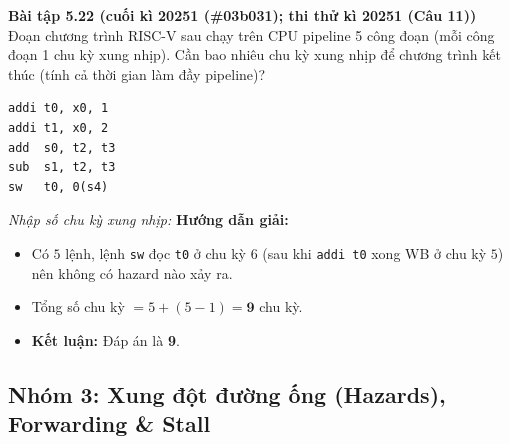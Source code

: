 \textbf{Bài tập 5.22 (cuối kì 20251 (\#03b031); thi thử kì 20251 (Câu 11))}\\
Đoạn chương trình RISC-V sau chạy trên CPU pipeline 5 công đoạn (mỗi công đoạn 1 chu kỳ xung nhịp). Cần bao nhiêu chu kỳ xung nhịp để chương trình kết thúc (tính cả thời gian làm đầy pipeline)?
\begin{lstlisting}
addi t0, x0, 1
addi t1, x0, 2
add  s0, t2, t3
sub  s1, t2, t3
sw   t0, 0(s4)
\end{lstlisting}
\textit{Nhập số chu kỳ xung nhịp:}
\textbf{Hướng dẫn giải:}
\begin{itemize}
    \item Có $5$ lệnh, lệnh \texttt{sw} đọc \texttt{t0} ở chu kỳ $6$ (sau khi \texttt{addi t0} xong WB ở chu kỳ $5$) nên không có hazard nào xảy ra.
    \item Tổng số chu kỳ $= 5 + (5 - 1) = \mathbf{9}$ chu kỳ.
    \item \textbf{Kết luận:} Đáp án là \textbf{9}.
\end{itemize}


\subsection{Nhóm 3: Xung đột đường ống (Hazards), Forwarding \& Stall}

